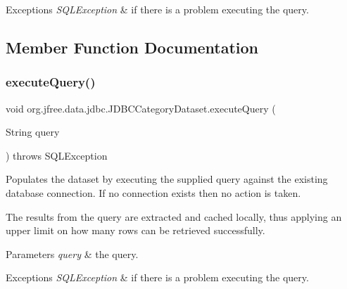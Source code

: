 \begin{DoxyExceptions}{Exceptions}
{\em S\+Q\+L\+Exception} & if there is a problem executing the query. \\
\hline
\end{DoxyExceptions}


\subsection{Member Function Documentation}
\mbox{\label{classorg_1_1jfree_1_1data_1_1jdbc_1_1_j_d_b_c_category_dataset_a9c414ca370a469776e84b4c27a587243}} 
\subsubsection{\texorpdfstring{execute\+Query()}{executeQuery()}\hspace{0.1cm}{\footnotesize\ttfamily [1/2]}}
{\footnotesize\ttfamily void org.\+jfree.\+data.\+jdbc.\+J\+D\+B\+C\+Category\+Dataset.\+execute\+Query (\begin{DoxyParamCaption}\item[{String}]{query }\end{DoxyParamCaption}) throws S\+Q\+L\+Exception}

Populates the dataset by executing the supplied query against the existing database connection. If no connection exists then no action is taken. 

The results from the query are extracted and cached locally, thus applying an upper limit on how many rows can be retrieved successfully.


\begin{DoxyParams}{Parameters}
{\em query} & the query.\\
\hline
\end{DoxyParams}

\begin{DoxyExceptions}{Exceptions}
{\em S\+Q\+L\+Exception} & if there is a problem executing the query. \\
\hline
\end{DoxyExceptions}
\mbox{\label{classorg_1_1jfree_1_1data_1_1jdbc_1_1_j_d_b_c_category_dataset_a7201f716b99ad1e92b30d07453ba14f7}} 
